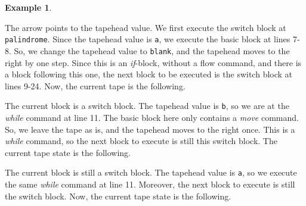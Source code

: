 \documentclass{amsart}
\theoremstyle{definition}
\newtheorem{example}[rules]{Example}
\begin{document}
\begin{example}
\begin{figure}[H]
    \end{figure}
    \noindent The arrow points to the tapehead value. We first execute the switch block at \texttt{palindrome}. Since the tapehead value is \texttt{a}, we execute the basic block at lines 7-8. So, we change the tapehead value to \texttt{blank}, and the tapehead moves to the right by one step. Since this is an \textit{if}-block, without a flow command, and there is a block following this one, the next block to be executed is the switch block at lines 9-24. Now, the current tape is the following.
    \begin{figure}[H]
        \centering
    \end{figure}
    \noindent The current block is a switch block. The tapehead value is \texttt{b}, so we are at the \textit{while} command at line 11. The basic block here only contains a \textit{move} command. So, we leave the tape as is, and the tapehead moves to the right once. This is a \textit{while} command, so the next block to execute is still this switch block. The current tape state is the following.
    \begin{figure}[H]
        \centering
    \end{figure}
    \noindent The current block is still a switch block. The tapehead value is \texttt{a}, so we execute the same \textit{while} command at line 11. Moreover, the next block to execute is still the switch block. Now, the current tape state is the following.
    \begin{figure}[H]
        \centering
\end{figure}
\end{example}
\end{document}
